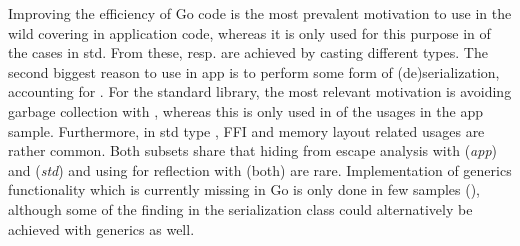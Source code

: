 
Improving the efficiency of Go code is the most prevalent motivation to use \unsafe{} in the wild covering  in application code, whereas it is only used for this purpose in  of the cases in std. 
From these,  resp.  are achieved by casting different types. 
The second biggest reason to use \unsafe{} in app is to perform some form of (de)serialization, accounting for .
For the standard library, the most relevant motivation is avoiding garbage collection with , whereas this is only used in  of the usages in the app sample.
Furthermore, in std type , FFI  and memory layout  related \unsafe{} usages are rather common.
Both subsets share that hiding from escape analysis with  (\textit{app}) and  (\textit{std}) and using \unsafe{} for reflection with  (both) are rare.
Implementation of generics functionality which is currently missing in Go is only done in few samples (), although some of the finding in the serialization class could alternatively be achieved with generics as well.


